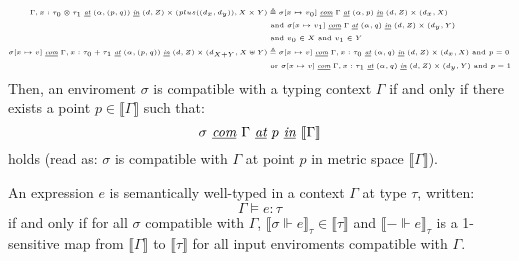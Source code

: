 \begin{definition}
\begin{equation}
\begin{tiny}
\begin{aligned}[c]
      \Gamma, x : \tau_0 \otimes \tau_1 \textit{ \underline{at} } (\alpha, (p,
      q))
      \textit{ \underline{in} } (d, Z) \times (plus((d_x, d_y)), X
      \times Y) &\triangleq
      \sigma[x \mapsto v_0] \textit{ \underline{com} } \Gamma \textit{
        \underline{at} } (\alpha, p) \textit{ \underline{in} } (d, Z) \times
      (d_x, X) \\
      & \text{ and } \sigma[x \mapsto v_1] \textit{ \underline{com} } \Gamma \textit{
        \underline{at} } (\alpha, q) \textit{ \underline{in} } (d, Z) \times (d_y, Y) \\
      & \text{ and } v_0 \in X \text{ and } v_1 \in Y \\
      \sigma[x \mapsto v] \textit{ \underline{com} } \Gamma, x : \tau_0 + \tau_1
      \textit{ \underline{at} } (\alpha, (p, q)) \textit{ \underline{in} } (d, Z)
      \times (d_{X + Y}, X \uplus Y) &\triangleq
      \sigma[x \mapsto v] \textit{ \underline{com} } \Gamma, x : \tau_0 \textit{
        \underline{at} } (\alpha, q) \textit{ \underline{in} } (d, Z) \times
      (d_x, X) \text{ and } p = 0 \\
      & \text{ or } \sigma[x \mapsto v] \textit{ \underline{com} } \Gamma, x :
      \tau_1 \textit{ \underline{at} } (\alpha, q) \textit{ \underline{in} } (d,
      Z) \times (d_y, Y) \text{ and } p = 1 \\
    \end{aligned}
    \end{tiny}
  \end{equation}
  Then, an enviroment $\sigma$ is compatible with a typing context $\Gamma$ if
  and only if there exists a point $p \in \llbracket \Gamma \rrbracket$ such
  that: 
  \begin{equation}
    \sigma \textit{ \underline{com} } \Gamma \textit{ \underline{at} } p
    \textit{ \underline{in} } \llbracket \Gamma \rrbracket
  \end{equation}
  holds (read as: $\sigma$ is compatible with $\Gamma$ at point $p$ in metric
  space $\llbracket \Gamma \rrbracket$).
\end{definition}


\begin{definition}
  An expression $e$ is semantically well-typed in a context $\Gamma$ at type
  $\tau$, written:
  $$\Gamma \vDash e : \tau$$
  if and only if for all $\sigma$ compatible with $\Gamma$, $\llbracket
  \sigma \Vdash e \rrbracket_{\tau} \in \llbracket \tau \rrbracket$ and
  $\llbracket - \Vdash e \rrbracket_{\tau}$ is a 1-sensitive map from
  $\llbracket \Gamma \rrbracket$ to $\llbracket \tau \rrbracket$ for all input
  enviroments compatible with $\Gamma$.
\end{definition}

